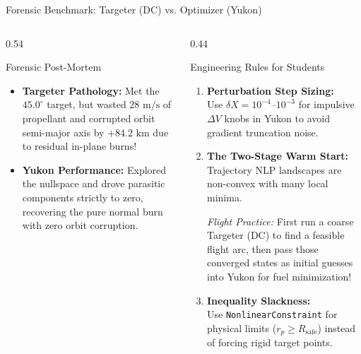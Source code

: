 \documentclass[aspectratio=169, 10pt]{beamer}
\begin{document}
\begin{frame}{Forensic Benchmark: Targeter (DC) vs. Optimizer (Yukon)}
\begin{columns}[t]
\begin{column}{0.54\textwidth}
            \begin{alertblock}{Forensic Post-Mortem}
                \scriptsize
                \begin{itemize}\setlength{\itemsep}{1pt}
                    \item \textbf{Targeter Pathology:} Met the $45.0^\circ$ target, but wasted \textbf{$28\text{ m/s}$} of propellant and corrupted orbit semi-major axis by $+84.2\text{ km}$ due to residual in-plane burns!
                    \item \textbf{Yukon Performance:} Explored the nullspace and drove parasitic components strictly to zero, recovering the pure normal burn with zero orbit corruption.
                \end{itemize}
            \end{alertblock}
        \end{column}

        \begin{column}{0.44\textwidth}
            \begin{exampleblock}{Engineering Rules for Students}
                \scriptsize
                \begin{enumerate}\setlength{\itemsep}{1.5pt}
                    \item \textbf{Perturbation Step Sizing:} \\
                    Use $\delta X = 10^{-4}\text{--}10^{-3}$ for impulsive $\Delta V$ knobs in Yukon to avoid gradient truncation noise.
                    \item \textbf{The Two-Stage Warm Start:} \\
                    Trajectory NLP landscapes are non-convex with many local minima.
                    \par\vspace{1pt}
                    \textit{Flight Practice:} First run a coarse Targeter (DC) to find a feasible flight arc, then pass those converged states as initial guesses into Yukon for fuel minimization!
                    \item \textbf{Inequality Slackness:} \\
                    Use \texttt{NonlinearConstraint} for physical limits ($r_p \ge R_{\text{safe}}$) instead of forcing rigid target points.
                \end{enumerate}
            \end{exampleblock}
        \end{column}
    \end{columns}
\end{frame}
\end{document}
